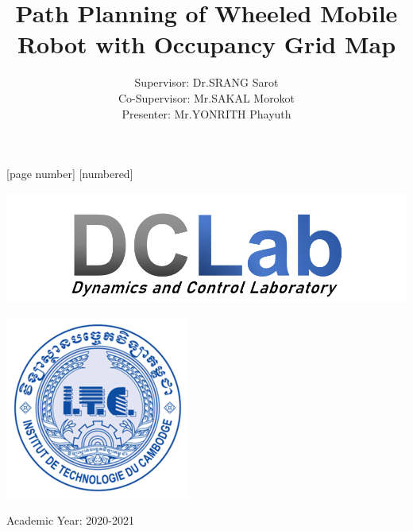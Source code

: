 \documentclass[12pt,aspectratio=169]{beamer}
\begin{document}
	[page number]
	[numbered]    %
	
	\title{Path Planning of Wheeled Mobile Robot with Occupancy Grid Map}
	
	\author{Supervisor: Dr.SRANG Sarot\\ Co-Supervisor: Mr.SAKAL Morokot\\ \makebox[1.26cm]\hfill Presenter: Mr.YONRITH Phayuth}
	
	\date{}
	
	
	
	
\begin{frame}[plain]
\begin{minipage}[b]{0.45\linewidth}
\raggedright \includegraphics[scale=0.2]{zlablg.png}
\end{minipage}
\quad
\begin{minipage}[b]{0.45\linewidth}
\raggedleft \includegraphics[scale=0.3]{zitclg.png}
\end{minipage}
\maketitle
\vspace{-10ex}
\centering Academic Year: 2020-2021
\end{frame}
\end{document}
